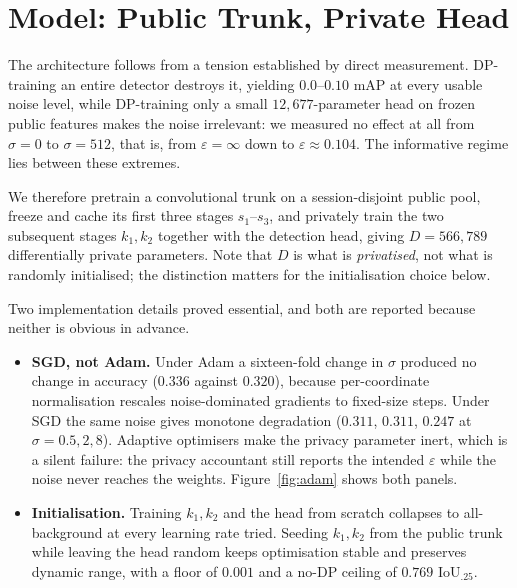 \section{Model: Public Trunk, Private Head}

The architecture follows from a tension established by direct measurement.
DP-training an entire detector destroys it, yielding $0.0$--$0.10$ mAP at every
usable noise level, while DP-training only a small $12{,}677$-parameter head on
frozen public features makes the noise irrelevant: we measured no effect at all
from $\sigma=0$ to $\sigma=512$, that is, from $\varepsilon=\infty$ down to
$\varepsilon\approx0.104$. The informative regime lies between these extremes.

\vspace{10pt}

We therefore pretrain a convolutional trunk on a session-disjoint public pool,
freeze and cache its first three stages $s_1$--$s_3$, and privately train the
two subsequent stages $k_1,k_2$ together with the detection head, giving
$D=566{,}789$ differentially private parameters. Note that $D$ is what is
\emph{privatised}, not what is randomly initialised; the distinction matters for
the initialisation choice below.

\vspace{10pt}

Two implementation details proved essential, and both are reported because
neither is obvious in advance.

\begin{itemize}
  \item \textbf{SGD, not Adam.} Under Adam a sixteen-fold change in $\sigma$
  produced no change in accuracy ($0.336$ against $0.320$), because
  per-coordinate normalisation rescales noise-dominated gradients to
  fixed-size steps. Under SGD the same noise gives monotone degradation
  ($0.311$, $0.311$, $0.247$ at $\sigma=0.5,2,8$). Adaptive optimisers make the
  privacy parameter inert, which is a silent failure: the privacy accountant
  still reports the intended $\varepsilon$ while the noise never reaches the
  weights. Figure~\ref{fig:adam} shows both panels.
  \item \textbf{Initialisation.} Training $k_1,k_2$ and the head from scratch
  collapses to all-background at every learning rate tried. Seeding $k_1,k_2$
  from the public trunk while leaving the head random keeps optimisation stable
  and preserves dynamic range, with a floor of $0.001$ and a no-DP ceiling of
  $0.769$ IoU$_{.25}$.
\end{itemize}

